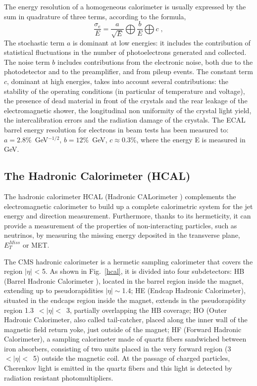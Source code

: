 The energy resolution of a homogeneous calorimeter is usually expressed by the sum
in quadrature of three terms, according to the formula,
\begin{equation}
\frac{\sigma_e}{E}=\frac{a}{\sqrt{E}} \bigoplus \frac{b}{E} \bigoplus c \; ,
\end{equation}
The stochastic term $a$ is dominant at low energies: it includes the contribution
of statistical fluctuations in the number of photoelectrons generated and collected.
The noise term $b$ includes contributions from the electronic noise,
both due to the photodetector and to the preamplifier, and from pileup
events. 
The constant term $c$, dominant at high energies, takes into account several contributions:
the stability of the operating conditions (in particular of temperature and voltage), the
presence of dead material in front of the crystals and the rear leakage of the electromagnetic 
shower, the longitudinal non uniformity of the crystal light yield, the intercalibration
errors and the radiation damage of the crystals.
The ECAL barrel energy resolution for electrons in beam tests has been measured 
to: $a=2.8\%$~GeV$^{-1/2}$, $b=12\%$~GeV, $c\approx$0.3\%, where the energy E is measured in GeV.

\subsection*{The Hadronic Calorimeter (HCAL)}
The hadronic calorimeter HCAL (Hadronic CALorimeter ) complements the
electromagnetic calorimeter to build up a complete calorimetric system for the jet energy and
direction measurement. Furthermore, thanks to its hermeticity, it can provide a measurement 
of the properties of non-interacting particles, such as neutrinos, by measuring the
missing energy deposited in the transverse plane, $E_T^{Miss}$ or MET.

The CMS hadronic calorimeter is
a hermetic sampling calorimeter that covers the region $|\eta|$ < 5. As shown in Fig.~\ref{hcal},
it is divided into four subdetectors: HB (Barrel Hadronic Calorimeter ), located in the
barrel region inside the magnet, extending up to pseudorapidities  $|\eta|\sim$1.4; HE (Endcap
Hadronic Calorimeter), situated in the endcaps region inside the magnet, extends in the
pseudorapidity region 1.3~$<|\eta|<$~3, partially overlapping the HB coverage; HO (Outer
Hadronic Calorimeter, also called tail-catcher, placed along the inner wall of the magnetic 
field return yoke, just outside of the magnet; HF (Forward Hadronic Calorimeter),
a sampling calorimeter made of quartz fibers sandwiched between iron absorbers,
consisting of two units placed in the very forward region (3 ~$<|\eta|<$~5) outside the magnetic coil. 
At the passage of charged particles, Cherenkov light is emitted in the quartz fibers 
and this light is detected by radiation resistant photomultipliers.


